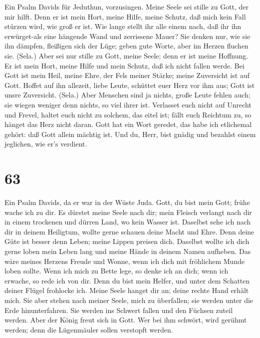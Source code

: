 Ein Psalm Davids für Jeduthun, vorzusingen. Meine Seele sei
stille zu Gott, der mir hilft.  Denn er ist mein Hort, meine
Hilfe, meine Schutz, daß mich kein Fall stürzen wird, wie groß er ist.
 Wie lange stellt ihr alle einem nach, daß ihr ihn
erwürget-als eine hängende Wand und zerrissene Mauer?  Sie
denken nur, wie sie ihn dämpfen, fleißigen sich der Lüge; geben gute
Worte, aber im Herzen fluchen sie. (Sela.)  Aber sei nur
stille zu Gott, meine Seele; denn er ist meine Hoffnung.  Er
ist mein Hort, meine Hilfe und mein Schutz, daß ich nicht fallen werde.
 Bei Gott ist mein Heil, meine Ehre, der Fels meiner Stärke;
meine Zuversicht ist auf Gott.  Hoffet auf ihn allezeit,
liebe Leute, schüttet euer Herz vor ihm aus; Gott ist unsre Zuversicht.
(Sela.)  Aber Menschen sind ja nichts, große Leute fehlen
auch; sie wiegen weniger denn nichts, so viel ihrer ist. 
Verlasset euch nicht auf Unrecht und Frevel, haltet euch nicht zu
solchem, das eitel ist; fällt euch Reichtum zu, so hänget das Herz nicht
daran.  Gott hat ein Wort geredet, das habe ich etlichemal
gehört: daß Gott allein mächtig ist.  Und du, Herr, bist
gnädig und bezahlst einem jeglichen, wie er's verdient.

\hypertarget{section-62}{%
\section{63}\label{section-62}}

 Ein Psalm Davids, da er war in der Wüste Juda. Gott, du
bist mein Gott; frühe wache ich zu dir. Es dürstet meine Seele nach dir;
mein Fleisch verlangt nach dir in einem trockenen und dürren Land, wo
kein Wasser ist.  Daselbst sehe ich nach dir in deinem
Heiligtum, wollte gerne schauen deine Macht und Ehre.  Denn
deine Güte ist besser denn Leben; meine Lippen preisen dich.
 Daselbst wollte ich dich gerne loben mein Leben lang und
meine Hände in deinem Namen aufheben.  Das wäre meines
Herzens Freude und Wonne, wenn ich dich mit fröhlichem Munde loben
sollte.  Wenn ich mich zu Bette lege, so denke ich an dich;
wenn ich erwache, so rede ich von dir.  Denn du bist mein
Helfer, und unter dem Schatten deiner Flügel frohlocke ich. 
Meine Seele hanget dir an; deine rechte Hand erhält mich. 
Sie aber stehen nach meiner Seele, mich zu überfallen; sie werden unter
die Erde hinunterfahren.  Sie werden ins Schwert fallen und
den Füchsen zuteil werden.  Aber der König freut sich in
Gott. Wer bei ihm schwört, wird gerühmt werden; denn die Lügenmäuler
sollen verstopft werden.

